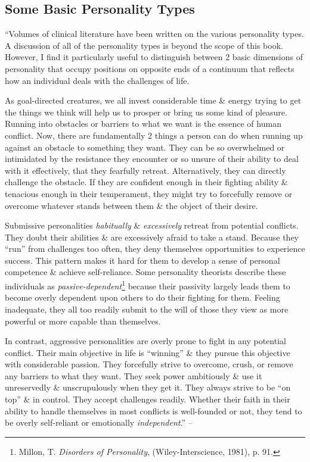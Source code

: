 \documentclass{article}
\numberwithin{equation}{section}
\begin{document}
\subsection{Some Basic Personality Types}
``Volumes of clinical literature have been written on the various personality types. A discussion of all of the personality types is beyond the scope of this book. However, I find it particularly useful to distinguish between 2 basic dimensions of personality that occupy positions on opposite ends of a continuum that reflects how an individual deals with the challenges of life.

As goal-directed creatures, we all invest considerable time \& energy trying to get the things we think will help us to prosper or bring us some kind of pleasure. Running into obstacles or barriers to what we want is the essence of human conflict. Now, there are fundamentally 2 things a person can do when running up against an obstacle to something they want. They can be so overwhelmed or intimidated by the resistance they encounter or so unsure of their ability to deal with it effectively, that they fearfully retreat. Alternatively, they can directly challenge the obstacle. If they are confident enough in their fighting ability \& tenacious enough in their temperament, they might try to forcefully remove or overcome whatever stands between them \& the object of their desire.

Submissive personalities \textit{habitually} \& \textit{excessively} retreat from potential conflicts. They doubt their abilities \& are excessively afraid to take a stand. Because they ``run'' from challenges too often, they deny themselves opportunities to experience success. This pattern makes it hard for them to develop a sense of personal competence \& achieve self-reliance. Some personality theorists describe these individuals as \textit{passive-dependent}\footnote{Millon, T. \textit{Disorders of Personality}, (Wiley-Interscience, 1981), p. 91.} because their passivity largely leads them to become overly dependent upon others to do their fighting for them. Feeling inadequate, they all too readily submit to the will of those they view as more powerful or more capable than themselves.

In contrast, aggressive personalities are overly prone to fight in any potential conflict. Their main objective in life is ``winning'' \& they pursue this objective with considerable passion. They forcefully strive to overcome, crush, or remove any barriers to what they want. They seek power ambitiously \& use it unreservedly \& unscrupulously when they get it. They always strive to be ``on top'' \& in control. They accept challenges readily. Whether their faith in their ability to handle themselves in most conflicts is well-founded or not, they tend to be overly self-reliant or emotionally \textit{independent}.'' -- \cite[pp. 28--29]{Simon2010}
\end{document}
